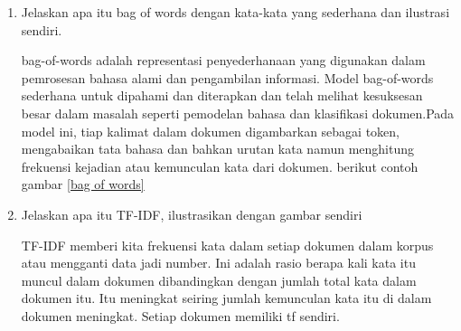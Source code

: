 \begin{enumerate}
\item Jelaskan apa itu bag of words dengan kata-kata yang sederhana dan ilustrasi sendiri.
\par bag-of-words adalah representasi penyederhanaan yang digunakan dalam pemrosesan bahasa alami dan pengambilan informasi. Model bag-of-words sederhana untuk dipahami dan diterapkan dan telah melihat kesuksesan besar dalam masalah seperti pemodelan bahasa dan klasiﬁkasi dokumen.Pada model ini, tiap kalimat dalam dokumen digambarkan sebagai token, mengabaikan tata bahasa dan bahkan urutan kata namun menghitung frekuensi kejadian atau kemunculan kata dari dokumen. berikut contoh gambar \ref{bag of words}


\item Jelaskan apa itu TF-IDF, ilustrasikan dengan gambar sendiri
\par TF-IDF memberi kita frekuensi kata dalam setiap dokumen dalam korpus atau mengganti data jadi number. Ini adalah rasio berapa kali kata itu muncul dalam dokumen dibandingkan dengan jumlah total kata dalam dokumen itu. Itu meningkat seiring jumlah kemunculan kata itu di dalam dokumen meningkat. Setiap dokumen memiliki tf sendiri.
\end{enumerate}

